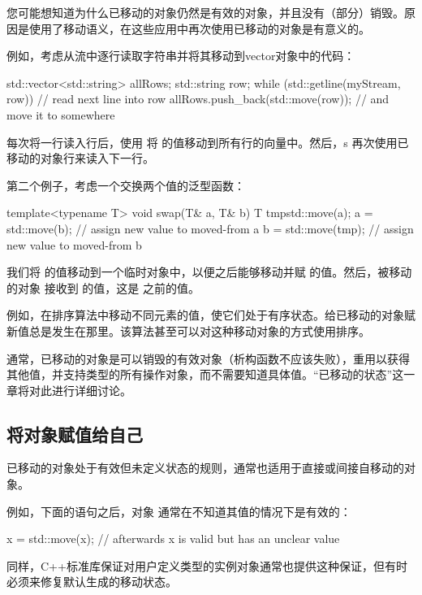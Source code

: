 您可能想知道为什么已移动的对象仍然是有效的对象，并且没有（部分）销毁。原因是使用了移动语义，在这些应用中再次使用已移动的对象是有意义的。

例如，考虑从流中逐行读取字符串并将其移动到vector对象中的代码：

\begin{cppcode}
std::vector<std::string> allRows;
std::string row;
while (std::getline(myStream, row)) { // read next line into row
	allRows.push_back(std::move(row)); // and move it to somewhere
}
\end{cppcode}

每次将一行读入行后，使用  将  的值移动到所有行的向量中。然后，s 再次使用已移动的对象行来读入下一行。

第二个例子，考虑一个交换两个值的泛型函数：

\begin{cppcode}
template<typename T>
void swap(T& a, T& b)
{
	T tmp{std::move(a)};
	a = std::move(b); // assign new value to moved-from a
	b = std::move(tmp); // assign new value to moved-from b
}
\end{cppcode}

我们将  的值移动到一个临时对象中，以便之后能够移动并赋  的值。然后，被移动的对象  接收到  的值，这是  之前的值。

例如，在排序算法中移动不同元素的值，使它们处于有序状态。给已移动的对象赋新值总是发生在那里。该算法甚至可以对这种移动对象的方式使用排序。

通常，已移动的对象是可以销毁的有效对象（析构函数不应该失败），重用以获得其他值，并支持类型的所有操作对象，而不需要知道具体值。“已移动的状态”这一章将对此进行详细讨论。

\subsection{将对象赋值给自己}

已移动的对象处于有效但未定义状态的规则，通常也适用于直接或间接自移动的对象。

例如，下面的语句之后，对象  通常在不知道其值的情况下是有效的：

\begin{cppcode}
x = std::move(x); // afterwards x is valid but has an unclear value
\end{cppcode}

同样，C++标准库保证对用户定义类型的实例对象通常也提供这种保证，但有时必须来修复默认生成的移动状态。


